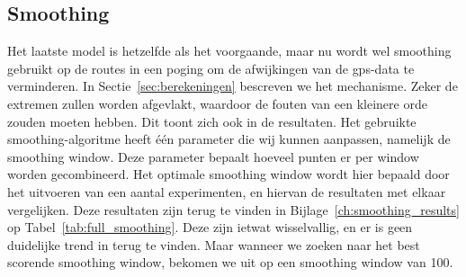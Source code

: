 \subsection{Smoothing}
Het laatste model is hetzelfde als het voorgaande, maar nu wordt wel smoothing
gebruikt op de routes in een poging om de afwijkingen van de \ac{gps}-data te
verminderen. In Sectie~\ref{sec:berekeningen} bescreven we het mechanisme.
Zeker de extremen zullen worden afgevlakt, waardoor de fouten van een kleinere
orde zouden moeten hebben. Dit toont zich ook in de resultaten. Het gebruikte
smoothing-algoritme heeft één parameter die wij kunnen aanpassen, namelijk de
smoothing window. Deze parameter bepaalt hoeveel punten er per window worden
gecombineerd. Het optimale smoothing window wordt hier bepaald door het
uitvoeren van een aantal experimenten, en hiervan de resultaten met elkaar
vergelijken. Deze resultaten zijn terug te vinden in
Bijlage~\ref{ch:smoothing_results} op Tabel~\ref{tab:full_smoothing}. Deze zijn
ietwat wisselvallig, en er is geen duidelijke trend in terug te vinden.
Maar wanneer we zoeken naar het best scorende smoothing window, bekomen we uit
op een smoothing window van 100.

